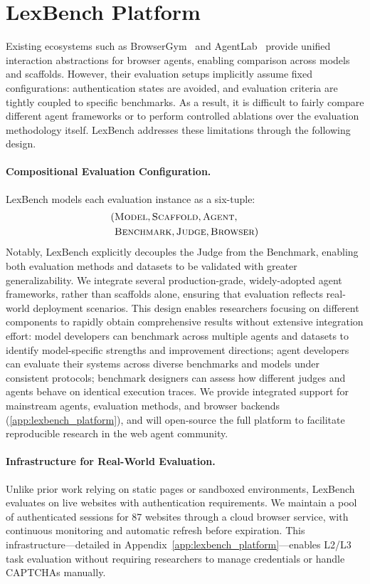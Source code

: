 \section{LexBench Platform}
\label{sec:platform}

Existing ecosystems such as BrowserGym~\cite{drouin2024workarenacapablewebagents} and AgentLab~\cite{dechezelles2025browsergymecosystemwebagent} provide unified interaction abstractions for browser agents, enabling comparison across models and scaffolds. However, their evaluation setups implicitly assume fixed configurations: authentication states are avoided, and evaluation criteria are tightly coupled to specific benchmarks. As a result, it is difficult to fairly compare different agent frameworks or to perform controlled ablations over the evaluation methodology itself. LexBench addresses these limitations through the following design.

\paragraph{Compositional Evaluation Configuration.}
LexBench models each evaluation instance as a six-tuple:
\[
\begin{aligned}
(&\textsc{Model}, \textsc{Scaffold}, \textsc{Agent}, \\
&\textsc{Benchmark}, \textsc{Judge}, \textsc{Browser})
\end{aligned}
\]
Notably, LexBench explicitly decouples the Judge from the Benchmark, enabling both evaluation methods and datasets to be validated with greater generalizability. We integrate several production-grade, widely-adopted agent frameworks, rather than scaffolds alone, ensuring that evaluation reflects real-world deployment scenarios. This design enables researchers focusing on different components to rapidly obtain comprehensive results without extensive integration effort: model developers can benchmark across multiple agents and datasets to identify model-specific strengths and improvement directions; agent developers can evaluate their systems across diverse benchmarks and models under consistent protocols; benchmark designers can assess how different judges and agents behave on identical execution traces. We provide integrated support for mainstream agents, evaluation methods, and browser backends (\cref{app:lexbench_platform}), and will open-source the full platform to facilitate reproducible research in the web agent community.

\paragraph{Infrastructure for Real-World Evaluation.}
Unlike prior work relying on static pages or sandboxed environments, LexBench evaluates on live websites with authentication requirements. We maintain a pool of authenticated sessions for 87 websites through a cloud browser service, with continuous monitoring and automatic refresh before expiration. This infrastructure---detailed in Appendix~\cref{app:lexbench_platform}---enables L2/L3 task evaluation without requiring researchers to manage credentials or handle CAPTCHAs manually.